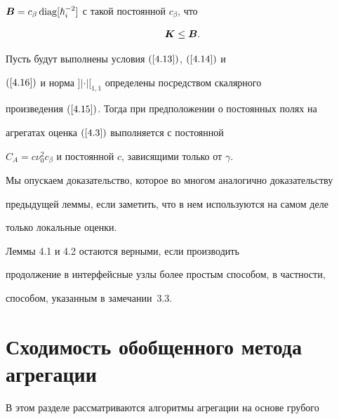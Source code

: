 ${\boldsymbol B}=c_\beta\operatorname{diag} [\hbar^{-2}_i]$ с такой постоянной $c_\beta$, что


\begin{equation}\label{4.16}


{\bi K}\le {\bi B}.


\end{equation}





\begin{lems}


Пусть будут выполнены условия $(\ref{4.13})$, $(\ref{4.14})$ и


$(\ref{4.16})$ и норма $]|\cdot|[_{{1,1}}$ определены посредством скалярного


произведения $(\ref{4.15})$. Тогда при предположении о постоянных полях на


агрегатах оценка $(\ref{4.3})$ выполняется с постоянной


$C_A=c\nu^2_0c_\beta$ и постоянной $c$, зависящими только от $\gamma$.


\end{lems}





Мы опускаем доказательство, которое во многом аналогично доказательству


предыдущей леммы, если заметить, что в нем используются на самом деле


только локальные оценки.





\begin{notes}


Леммы 4.1 и 4.2 остаются верными, если производить


продолжение в интерфейсные узлы более простым способом, в частности,


способом, указанным в замечании~3.3.


\end{notes}





\section{ Сходимость обобщенного метода агрегации}





В этом разделе рассматриваются алгоритмы агрегации на основе грубого


